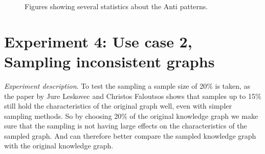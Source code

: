 \documentclass[11pt,letterpaper ,oneside ]{book}
\begin{document}
\begin{figure}[ht]
	\centering
	\caption{Figures showing several statistics about the Anti patterns.}
	\label{fig:AntipatternStats}
\end{figure}

\section{Experiment 4: Use case 2, Sampling inconsistent graphs} 
\textit{Experiment description}. To test the sampling a sample size of 20\% is taken, as the paper by Jure Leskovec and Christos Faloutsos \cite{Leskovec:2006} shows that samples up to 15\% still hold the characteristics of the original graph well, even with simpler sampling methods. So by choosing 20\% of the original knowledge graph we make sure that the sampling is not having large effects on the characteristics of the sampled graph. And can therefore better compare the sampled knowledge graph with the original knowledge graph. \\
\end{document}
